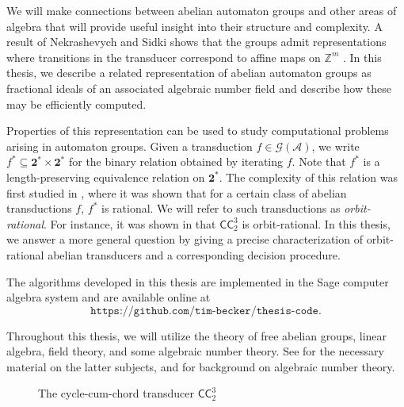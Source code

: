 \documentclass[12pt, letterpaper]{article}
\newcommand{\Z}{\mathbb Z}
\newcommand{\bin}{\mathbf 2}
\newcommand{\A}{\mathcal A}
\newcommand{\CC}{\mathsf{CC}}
\newcommand{\gp}{\mathcal G}
\newcommand{\codeurl}{\texttt{https://github.com/tim-becker/thesis-code}}
\begin{document}
We will make connections between abelian automaton groups and other areas of
algebra that will provide useful insight into their structure and complexity.
A result of Nekrashevych and Sidki shows that the groups admit representations
where transitions in the transducer correspond to affine maps on $\Z^m$
\cite{nekrashevych2004automorphisms}.  In this thesis, we describe a related
representation of abelian automaton groups as fractional ideals of an
associated algebraic number field and describe how these may be efficiently
computed.

Properties of this representation can be used to study computational problems
arising in automaton groups. Given a transduction $f \in \gp(\A)$, we write
$f^* \subseteq \bin^* \times \bin^*$ for the binary relation obtained by
iterating $f$. Note that $f^*$ is a length-preserving equivalence relation on
$\bin^*$.  The complexity of this relation was first studied in
\cite{jalc170214}, where it was shown that for a certain class of abelian
transductions $f$, $f^*$ is rational. We will refer to such transductions as
\emph{orbit-rational}. For instance, it was shown in \cite{jalc170214} that
$\CC^3_2$ is orbit-rational.  In this thesis, we answer a more general question
by giving a precise characterization of orbit-rational abelian transducers and
a corresponding decision procedure.

The algorithms developed in this thesis are implemented in the Sage computer
algebra system and are available online at
\[
    \codeurl.
\]

Throughout this thesis, we will utilize the theory of free abelian groups,
linear algebra, field theory, and some algebraic number theory. See
\cite{Hungerford78} for the necessary material on the latter subjects, and
\cite{ireland1990classical, stein2012algebraic} for background on algebraic
number theory.
\begin{figure}
    \centering
    \caption{The cycle-cum-chord transducer $\CC^3_2$}
    \label{fig:cc-3-2}
\end{figure}
\end{document}
